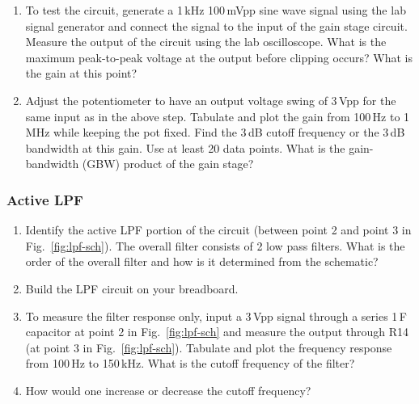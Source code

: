 \documentclass[letterpaper, 11pt]{article}
\begin{document}
\begin{enumerate}
	\item To test the circuit, generate a 1\,kHz 100\,mVpp sine wave signal using the lab signal generator and connect the signal to the input of the gain stage circuit. Measure the output of the circuit using the lab oscilloscope. What is the maximum peak-to-peak voltage at the output before clipping occurs? What is the gain at this point?
	
	\item Adjust the potentiometer to have an output voltage swing of 3\,Vpp for the same input as in the above step. 
	Tabulate and plot the gain from 100\,Hz to 1\,MHz while keeping the pot fixed. Find the 3\,dB cutoff frequency or the 3\,dB bandwidth at this gain. Use at least 20 data points. What is the gain-bandwidth (GBW) product of the gain stage? 
	

\end{enumerate}

\subsubsection{Active LPF}
\begin{enumerate}
	\item Identify the active LPF portion of the circuit (between point 2 and point 3 in Fig.~\ref{fig:lpf-sch}). The overall filter consists of 2 low pass filters. What is the order of the overall filter and how is it determined from the schematic?
	
	\item Build the LPF circuit on your breadboard. 
	
	\item To measure the filter response only, input a 3\,Vpp signal through a series 1\,\si{\micro}F capacitor at point 2 in Fig.~\ref{fig:lpf-sch} and measure the output through R14 (at point 3 in Fig.~\ref{fig:lpf-sch}). Tabulate and plot the frequency response from 100\,Hz to 150\,kHz. What is the cutoff frequency of the filter?
	
	\item How would one increase or decrease the cutoff frequency?
	
\end{enumerate}
\end{document}

